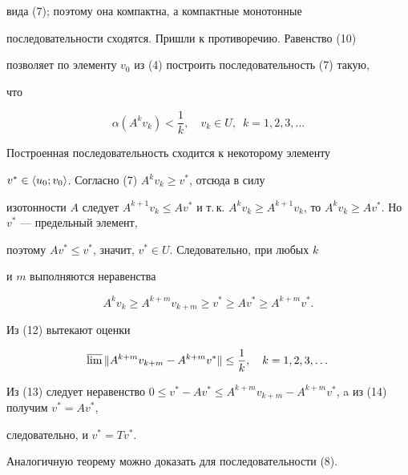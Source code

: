 вида (7); поэтому она компактна, а компактные монотонные 


последовательности сходятся. Пришли к противоречию. Равенство (10) 


позволяет по элементу $v_0$ из (4) построить последовательность (7) такую, 


что 


\begin{equation} 


\alpha(A^k v_k)<\frac{1}{k},\quad v_k\in U,\ \; k=1,2,3,\dotsc 


\end{equation} 


Построенная последовательность сходится к некоторому элементу 


$v^*\in\langle u_0;v_0\rangle$. Согласно (7)\; $A^k v_k\ge v^*$, отсюда в силу 


изотонности $A$ следует $A^{k+1}v_k\le A v^*$ и т.\,к. $A^k v_k\ge 


A^{k+1}v_k$, то $A^k v_k\ge A v^*$. Но $v^*$ --- предельный элемент, 


поэтому $A v^*\le v^*$, значит, $v^*\in U$. Следовательно, при любых $k$ 


и $m$ выполняются неравенства 


\begin{equation} 


A^k v_k\ge A^{k+m}v_{k+m}\ge v^*\ge A v^*\ge A^{k+m}v^*. 


\end{equation} 


Из (12) вытекают оценки 


\begin{equation} 


\varlimsup\|A^{k+m}v_{k+m}-A^{k+m}v^*\|\le\frac{1}{k},\quad 


k=1,2,3,\dotsc 


\end{equation} 


Из (13) следует неравенство $0\le v^*-A v^*\le 


A^{k+m}v_{k+m}-A^{k+m}v^*$, a из (14) получим $v^*=A v^*$, 


следовательно, и $v^*=T v^*$. 


 


Аналогичную теорему можно доказать для последовательности (8). 


 


